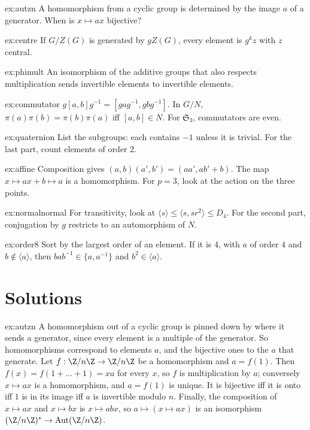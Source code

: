 \begin{hint}{ex:autzn}
A homomorphism from a cyclic group is determined by the image $a$ of a generator. When is $x\mapsto ax$ bijective?
\end{hint}
\begin{hint}{ex:centre}
If $G/Z(G)$ is generated by $gZ(G)$, every element is $g^kz$ with $z$ central.
\end{hint}
\begin{hint}{ex:phimult}
An isomorphism of the additive groups that also respects multiplication sends invertible elements to invertible elements.
\end{hint}
\begin{hint}{ex:commutator}
$g[a,b]g^{-1}=[gag^{-1},gbg^{-1}]$. In $G/N$, $\pi(a)\pi(b)=\pi(b)\pi(a)$ iff $[a,b]\in N$. For $\mathfrak S_3$, commutators are even.
\end{hint}
\begin{hint}{ex:quaternion}
List the subgroups: each contains $-1$ unless it is trivial. For the last part, count elements of order $2$.
\end{hint}
\begin{hint}{ex:affine}
Composition gives $(a,b)(a',b')=(aa',ab'+b)$. The map $x\mapsto ax+b\mapsto a$ is a homomorphism. For $p=3$, look at the action on the three points.
\end{hint}
\begin{hint}{ex:normalnormal}
For transitivity, look at $\langle s\rangle\le\langle s,sr^2\rangle\le D_4$. For the second part, conjugation by $g$ restricts to an automorphism of $N$.
\end{hint}
\begin{hint}{ex:order8}
Sort by the largest order of an element. If it is $4$, with $a$ of order $4$ and $b\notin\langle a\rangle$, then $bab^{-1}\in\{a,a^{-1}\}$ and $b^2\in\langle a\rangle$.
\end{hint}

\section{Solutions}

\begin{solution}{ex:autzn}
\idea A homomorphism out of a cyclic group is pinned down by where it sends a generator, since every element is a multiple of the generator. So homomorphisms correspond to elements $a$, and the bijective ones to the $a$ that generate.
\writeup Let $f:\Z/n\Z\to\Z/n\Z$ be a homomorphism and $a=f(1)$. Then $f(x)=f(1+\dots+1)=xa$ for every $x$, so $f$ is multiplication by $a$; conversely $x\mapsto ax$ is a homomorphism, and $a=f(1)$ is unique. It is bijective iff it is onto iff $1$ is in its image iff $a$ is invertible modulo $n$. Finally, the composition of $x\mapsto ax$ and $x\mapsto bx$ is $x\mapsto abx$, so $a\mapsto(x\mapsto ax)$ is an isomorphism $(\Z/n\Z)^*\to\operatorname{Aut}(\Z/n\Z)$.
\end{solution}

